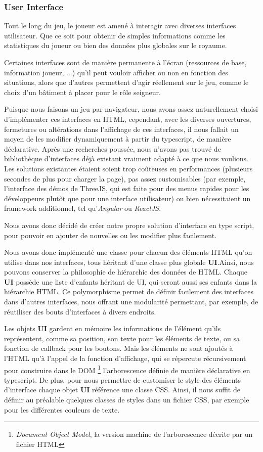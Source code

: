 \subsubsection{User Interface}
    Tout le long du jeu, le joueur est amené à interagir avec diverses interfaces utilisateur. Que ce soit pour obtenir de simples informations comme les statistiques du joueur ou bien des données plus globales sur le royaume. 
    
    Certaines interfaces sont de manière permanente à l'écran (ressources de base, information joueur, ...) qu'il peut vouloir afficher ou non en fonction des situations, alors que d'autres permettent d'agir réellement sur le jeu, comme le choix d'un bâtiment à placer pour le rôle seigneur.
    
    Puisque nous faisons un jeu par navigateur, nous avons assez naturellement choisi d'implémenter ces interfaces en HTML, cependant, avec les diverses ouvertures, fermetures ou altérations dans l'affichage de ces interfaces, il nous fallait un moyen de les modifier dynamiquement à partir du typescript, de manière déclarative.
    Après une recherches poussée, nous n'avons pas trouvé de bibliothèque d'interfaces déjà existant vraiment adapté à ce que nous voulions. Les solutions existantes étaient soient trop coûteuses en performances (plusieurs secondes de plus pour charger la page), pas assez customisables (par exemple, l'interface des démos de ThreeJS, qui est faite pour des menus rapides pour les développeurs plutôt que pour une interface utilisateur) ou bien nécessitaient un framework additionnel, tel qu'\textit{Angular} ou \textit{ReactJS}.
    
    Nous avons donc décidé de créer notre propre solution d'interface en type script, pour pouvoir en ajouter de nouvelles ou les modifier plus facilement.

    Nous avons donc implémenté une classe pour chacun des éléments HTML qu'on utilise dans nos interfaces, tous héritant d'une classe plus globale \textbf{UI}.Ainsi, nous pouvons conserver la philosophie de hiérarchie des données de HTML. Chaque \textbf{UI} possède une liste d'enfants héritant de UI, qui seront aussi ses enfants dans la hiérarchie HTML. Ce polymorphisme permet de définir facilement des interfaces dans d'autres interfaces, nous offrant une modularité permettant, par exemple, de réutiliser des bouts d'interfaces à divers endroits.
    
    Les objets \textbf{UI} gardent en mémoire les informations de l'élément qu'ils représentent, comme sa position, son texte pour les éléments de texte, ou sa fonction de callback pour les boutons. Mais les éléments ne sont ajoutés à l'HTML qu'à l'appel de la fonction d'affichage, qui se répercute récursivement pour construire dans le DOM \footnote{
    \textit{Document Object Model}, la version machine de l'arborescence décrite par un fichier HTML
    } 
    l'arborescence définie de manière déclarative en typescript.
    De plus, pour nous permettre de customiser le style des éléments d'interface chaque objet \textbf{UI} référence une classe CSS. Ainsi, il nous suffit de définir au préalable quelques classes de styles dans un fichier CSS, par exemple pour les différentes couleurs de texte.

